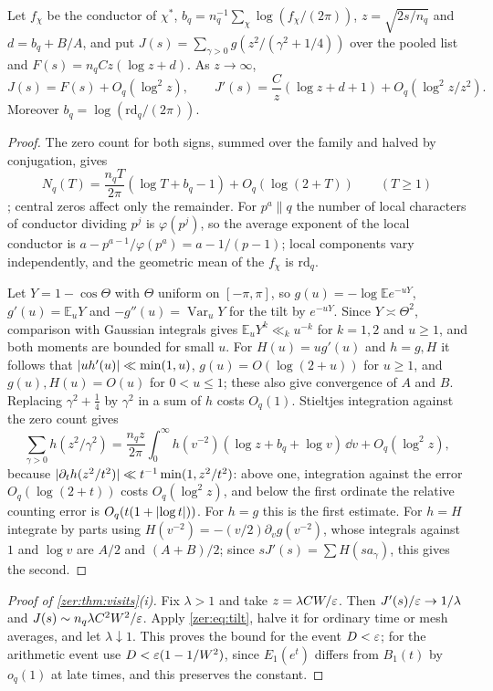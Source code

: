 \begin{lemma}\label{zer:lem:visittransform}
Let $f_\chi$ be the conductor of $\chi^*$, $b_q=n_q^{-1}\sum_\chi\log(f_\chi/(2\pi))$, $z=\sqrt{2s/n_q}$ and
$d=b_q+B/A$, and put $J(s)=\sum_{\gamma>0}g(z^2/(\gamma^2+1/4))$ over the pooled list and
$F(s)=n_qCz(\log z+d)$. As $z\to\infty$,
\[
 J(s)=F(s)+O_q(\log^2z),\qquad J'(s)=\frac Cz(\log z+d+1)+O_q(\log^2z/z^2).
\]
Moreover $b_q=\log(\mathrm{rd}_q/(2\pi))$.
\end{lemma}
\begin{proof}
The zero count for both signs, summed over the family and halved by conjugation, gives
\[
 N_q(T)=\frac{n_qT}{2\pi}(\log T+b_q-1)+O_q(\log(2+T))\qquad(T\ge1)
\]
\cite{BennettMartinOBryantRechnitzer2021Counting}; central zeros affect only the remainder. For
$p^a\parallel q$ the number of local characters of conductor dividing $p^j$ is $\varphi(p^j)$, so the
average exponent of the local conductor is $a-p^{a-1}/\varphi(p^a)=a-1/(p-1)$; local components vary
independently, and the geometric mean of the $f_\chi$ is $\mathrm{rd}_q$.

Let $Y=1-\cos\Theta$ with $\Theta$ uniform on $[-\pi,\pi]$, so $g(u)=-\log\mathbb Ee^{-uY}$,
$g'(u)=\mathbb E_uY$ and $-g''(u)=\operatorname{Var}_uY$ for the tilt by $e^{-uY}$. Since
$Y\asymp\Theta^2$, comparison with Gaussian integrals gives $\mathbb E_uY^k\ll_ku^{-k}$ for $k=1,2$
and $u\ge1$, and both moments are bounded for small $u$. For $H(u)=ug'(u)$ and $h=g,H$ it follows that
$\lvert uh'(u)\rvert\ll\min(1,u)$, $g(u)=O(\log(2+u))$ for $u\ge1$, and $g(u),H(u)=O(u)$ for $0<u\le1$; these
also give convergence of $A$ and $B$. Replacing $\gamma^2+\tfrac14$ by $\gamma^2$ in a sum of $h$
costs $O_q(1)$. Stieltjes integration against the zero count gives
\[
 \sum_{\gamma>0}h(z^2/\gamma^2)=\frac{n_qz}{2\pi}\int_0^\infty h(v^{-2})(\log z+b_q+\log v)\,\dd v+O_q(\log^2z),
\]
because $\lvert\partial_th(z^2/t^2)\rvert\ll t^{-1}\min(1,z^2/t^2)$: above one, integration against the
error $O_q(\log(2+t))$ costs $O_q(\log^2z)$, and below the first ordinate the relative counting
error is $O_q(t(1+\lvert\log t\rvert))$. For $h=g$ this is the first estimate. For $h=H$ integrate by parts
using $H(v^{-2})=-(v/2)\partial_vg(v^{-2})$, whose integrals against $1$ and $\log v$ are $A/2$ and
$(A+B)/2$; since $sJ'(s)=\sum H(sa_\gamma)$, this gives the second.
\end{proof}

\begin{proof}[Proof of \cref{zer:thm:visits}\textup{(i)}]
Fix $\lambda>1$ and take $z=\lambda CW/\varepsilon$. Then $J'(s)/\varepsilon\to1/\lambda$ and
$J(s)\sim n_q\lambda C^2W^2/\varepsilon$. Apply \eqref{zer:eq:tilt}, halve it for ordinary time or mesh
averages, and let $\lambda\downarrow1$. This proves the bound for the event $D<\varepsilon$; for the
arithmetic event use $D<\varepsilon(1-1/W^2)$, since $E_1(e^t)$ differs from $B_1(t)$ by $o_q(1)$ at late
times, and this preserves the constant.
\end{proof}

